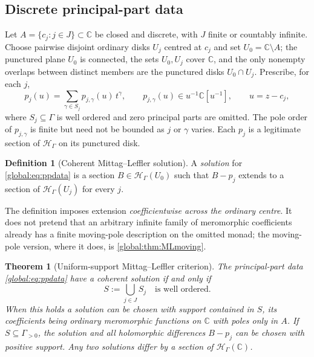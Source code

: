 \documentclass[11pt,letterpaper]{article}
\newtheorem{theorem}{Theorem}[section]
\theoremstyle{definition}
\newtheorem{definition}[definition]{Definition}
\theoremstyle{remark}
\newcommand{\C}{\mathbb C}
\newcommand{\HH}{\mathscr H_\Gamma}
\numberwithin{equation}{section}
\begin{document}
\subsection{Discrete principal-part data}

Let $A=\{c_j:j\in J\}\subset\C$ be closed and discrete, with $J$ finite or countably infinite. Choose pairwise disjoint ordinary disks $U_j$ centred at $c_j$ and set $U_0=\C\setminus A$; the punctured plane $U_0$ is connected, the sets $U_0,U_j$ cover $\C$, and the only nonempty overlaps between distinct members are the punctured disks $U_0\cap U_j$. Prescribe, for each $j$,
\begin{equation}\label{global:eq:ppdata}
  p_j(u)=\sum_{\gamma\in S_j}p_{j,\gamma}(u)\,t^\gamma,
  \qquad p_{j,\gamma}(u)\in u^{-1}\C[u^{-1}],
  \qquad u=z-c_j,
\end{equation}
where $S_j\subseteq\Gamma$ is well ordered and zero principal parts are omitted. The pole order of $p_{j,\gamma}$ is finite but need not be bounded as $j$ or $\gamma$ varies. Each $p_j$ is a legitimate section of $\HH$ on its punctured disk.

\begin{definition}[Coherent Mittag--Leffler solution]\label{global:def:MLsolution}
A \emph{solution} for \eqref{global:eq:ppdata} is a section $B\in\HH(U_0)$ such that $B-p_j$ extends to a section of $\HH(U_j)$ for every $j$.
\end{definition}

The definition imposes extension \emph{coefficientwise across the ordinary centre}. It does not pretend that an arbitrary infinite family of meromorphic coefficients already has a finite moving-pole description on the omitted monad; the moving-pole version, where it does, is \cref{global:thm:MLmoving}.

\begin{theorem}[Uniform-support Mittag--Leffler criterion]\label{global:thm:ML}
The principal-part data \eqref{global:eq:ppdata} have a coherent solution if and only if
\begin{equation}\label{global:eq:MLcriterion}
  S:=\bigcup_{j\in J}S_j\quad\text{is well ordered.}
\end{equation}
When this holds a solution can be chosen with support contained in $S$, its coefficients being ordinary meromorphic functions on $\C$ with poles only in $A$. If $S\subseteq\Gamma_{>0}$, the solution and all holomorphic differences $B-p_j$ can be chosen with positive support. Any two solutions differ by a section of $\HH(\C)$.
\end{theorem}
\end{document}
